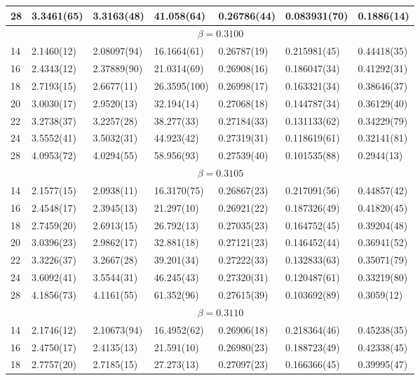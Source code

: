 \documentclass[12pt]{article}
\begin{document}
\begin{table}
\begin{center}
{\begin{tabular}{|l|l|l|l|l|l|l|}
28 & 3.3461(65) & 3.3163(48) & 41.058(64) & 0.26786(44) & 0.083931(70) & 0.1886(14)\\ 
\hline 
  & \multicolumn{6}{|c|}{$ \beta = 0.3100 $} \\ 
 \hline 
14 & 2.1460(12) & 2.08097(94) & 16.1664(61) & 0.26787(19) & 0.215981(45) & 0.44418(35)\\ 
16 & 2.4343(12) & 2.37889(90) & 21.0314(69) & 0.26908(16) & 0.186047(34) & 0.41292(31)\\ 
18 & 2.7193(15) & 2.6677(11) & 26.3595(100) & 0.26998(17) & 0.163321(34) & 0.38646(37)\\ 
20 & 3.0030(17) & 2.9520(13) & 32.194(14) & 0.27068(18) & 0.144787(34) & 0.36129(40)\\ 
22 & 3.2738(37) & 3.2257(28) & 38.277(33) & 0.27184(33) & 0.131133(62) & 0.34229(79)\\ 
24 & 3.5552(41) & 3.5032(31) & 44.923(42) & 0.27319(31) & 0.118619(61) & 0.32141(81)\\ 
28 & 4.0953(72) & 4.0294(55) & 58.956(93) & 0.27539(40) & 0.101535(88) & 0.2944(13)\\ 
\hline 
  & \multicolumn{6}{|c|}{$ \beta = 0.3105 $} \\ 
 \hline 
14 & 2.1577(15) & 2.0938(11) & 16.3170(75) & 0.26867(23) & 0.217091(56) & 0.44857(42)\\ 
16 & 2.4548(17) & 2.3945(13) & 21.297(10) & 0.26921(22) & 0.187326(49) & 0.41820(45)\\ 
18 & 2.7459(20) & 2.6913(15) & 26.792(13) & 0.27035(23) & 0.164752(45) & 0.39204(48)\\ 
20 & 3.0396(23) & 2.9862(17) & 32.881(18) & 0.27121(23) & 0.146452(44) & 0.36941(52)\\ 
22 & 3.3226(37) & 3.2667(28) & 39.201(34) & 0.27222(33) & 0.132833(63) & 0.35071(79)\\ 
24 & 3.6092(41) & 3.5544(31) & 46.245(43) & 0.27320(31) & 0.120487(61) & 0.33219(80)\\ 
28 & 4.1856(73) & 4.1161(55) & 61.352(96) & 0.27615(39) & 0.103692(89) & 0.3059(12)\\ 
\hline 
  & \multicolumn{6}{|c|}{$ \beta = 0.3110 $} \\ 
 \hline 
14 & 2.1746(12) & 2.10673(94) & 16.4952(62) & 0.26906(18) & 0.218364(46) & 0.45238(35)\\ 
16 & 2.4750(17) & 2.4135(13) & 21.591(10) & 0.26980(23) & 0.188723(49) & 0.42338(45)\\ 
18 & 2.7757(20) & 2.7185(15) & 27.273(13) & 0.27097(23) & 0.166366(45) & 0.39995(47)\\ 

\end{tabular}}
\end{center}
\end{table}
\end{document}
